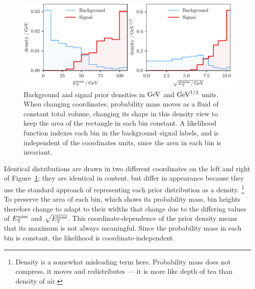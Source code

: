 \begin{figure}[tp]
\centering
\includegraphics[width=\textwidth]{figures/searches_sig_bkg_prior_likelihood.pdf}
\caption[
Background and signal prior densities
]{%
Background and signal prior densities in $\eV[G]$ and $\eV[G]^{1/2}$ units.
When changing coordinates, probability mass moves as a fluid of constant total
volume, changing its shape in this density view to keep the area of the
rectangle in each bin constant.
A likelihood function indexes each bin in the background--signal labels,
and is independent of the coordinates units, since the area in each bin is
invariant.
}
\label{fig:searches_sig_bkg_prior_likelihood}
\end{figure}

Identical distributions are drawn in two different coordinates
on the left and right of Figure~\ref{fig:searches_sig_bkg_prior_likelihood};
they are identical in content, but differ in appearance because they use the
standard approach of representing each prior distribution as a density.%
\footnote{%
Density is a somewhat misleading term here.
Probability mass does not compress, it moves and redistributes --- it is more
like depth of tea than density of air.%
}
To preserve the area of each bin, which shows its probability mass,
bin heights therefore change to adapt to their widths that change due to the
differing values of $\met$ and $\sqrt{\met}$.
This coordinate-dependence of the prior density means that its maximum is
not always meaningful.
Since the probability mass in each bin is constant, the likelihood is
coordinate-independent.

